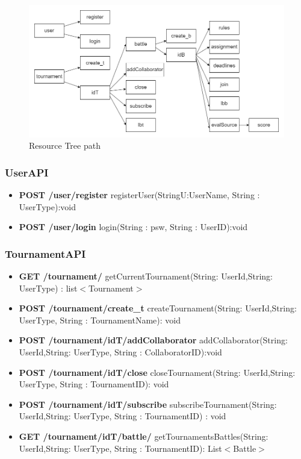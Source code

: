 \begin{figure}[H]
    \centering
    \includegraphics[width=1\linewidth]{misc//Images/RESTresources.png}
    \caption{Resource Tree path}
    \label{fig:enter-label}
\end{figure}
\subsubsection{UserAPI}

\begin{itemize}
\item \textbf{POST /user/register}\newline  
registerUser(StringU:UserName, String : UserType):void
\item \textbf{POST /user/login}\newline  
login(String : psw, String : UserID):void
\end{itemize}
\subsubsection{TournamentAPI}
\begin{itemize}
    \item \textbf{GET /tournament/}\newline  
    getCurrentTournament(String: UserId,String: UserType) : list$<$Tournament$>$
    \item \textbf{POST /tournament/create\_t}\newline  
    createTournament(String: UserId,String: UserType, String : TournamentName): void  
    \item \textbf{POST /tournament/{idT}/addCollaborator}\newline   
    addCollaborator(String: UserId,String: UserType, String : CollaboratorID):void  
    \item \textbf{POST /tournament/{idT}/close}\newline  
    closeTournament(String: UserId,String: UserType, String : TournamentID): void 
    \item  \textbf{POST /tournament/{idT}/subscribe}\newline  
    subscribeTournament(String: UserId,String: UserType, String : TournamentID) : void
    \item \textbf{GET /tournament/{idT}/battle/}\newline  
    getTournamentsBattles(String: UserId,String: UserType, String : TournamentID): List$<$Battle$>$  
\end{itemize}

